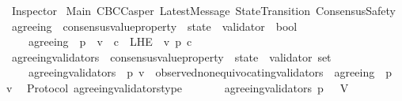 %
\begin{isabellebody}%
%
%
\isadelimtheory
%
\endisadelimtheory
%
\isatagtheory
{}\isamarkupfalse%
\ Inspector\isanewline
\isanewline
{}\ Main\ CBCCasper\ LatestMessage\ StateTransition\ ConsensusSafety\isanewline
\isanewline
{}%
\endisatagtheory
{\isafoldtheory}%
%
\isadelimtheory
\isanewline
%
\endisadelimtheory
\isanewline
\isanewline
\isanewline
\isanewline
\isanewline
\isanewline
\isanewline
\isanewline
\isanewline
\isanewline
\isanewline
\isanewline
\isanewline
\isanewline
\isanewline
\isanewline
\isanewline
\isanewline
{}\isamarkupfalse%
\ agreeing\ {\isacharcolon}{\isacharcolon}\ {\isachardoublequoteopen}{\isacharparenleft}consensus{\isacharunderscore}value{\isacharunderscore}property\ {\isacharasterisk}\ state\ {\isacharasterisk}\ validator{\isacharparenright}\ {\isasymRightarrow}\ bool{\isachardoublequoteclose}\isanewline
\ \ \isanewline
\ \ \ \ {\isachardoublequoteopen}agreeing\ {\isacharequal}\ {\isacharparenleft}{\isasymlambda}{\isacharparenleft}p{\isacharcomma}\ {\isasymsigma}{\isacharcomma}\ v{\isacharparenright}{\isachardot}\ {\isasymforall}\ c\ {\isasymin}\ L{\isacharunderscore}H{\isacharunderscore}E\ {\isasymsigma}\ v{\isachardot}\ p\ c{\isacharparenright}{\isachardoublequoteclose}\isanewline
\isanewline
\isanewline
{}\isamarkupfalse%
\ agreeing{\isacharunderscore}validators\ {\isacharcolon}{\isacharcolon}\ {\isachardoublequoteopen}{\isacharparenleft}consensus{\isacharunderscore}value{\isacharunderscore}property\ {\isacharasterisk}\ state{\isacharparenright}\ {\isasymRightarrow}\ validator\ set{\isachardoublequoteclose}\isanewline
\ \ \isanewline
\ \ \ \ {\isachardoublequoteopen}agreeing{\isacharunderscore}validators\ {\isacharequal}\ {\isacharparenleft}{\isasymlambda}{\isacharparenleft}p{\isacharcomma}\ {\isasymsigma}{\isacharparenright}{\isachardot}{\isacharbraceleft}v\ {\isasymin}\ observed{\isacharunderscore}non{\isacharunderscore}equivocating{\isacharunderscore}validators\ {\isasymsigma}{\isachardot}\ agreeing\ \ {\isacharparenleft}p{\isacharcomma}\ {\isasymsigma}{\isacharcomma}\ v{\isacharparenright}{\isacharbraceright}{\isacharparenright}{\isachardoublequoteclose}\isanewline
\isanewline
{}\isamarkupfalse%
\ {\isacharparenleft}\ Protocol{\isacharparenright}\ agreeing{\isacharunderscore}validators{\isacharunderscore}type\ {\isacharcolon}\isanewline
\ \ {\isachardoublequoteopen}{\isasymforall}\ {\isasymsigma}\ {\isasymin}\ {\isasymSigma}{\isachardot}\ agreeing{\isacharunderscore}validators\ {\isacharparenleft}p{\isacharcomma}\ {\isasymsigma}{\isacharparenright}\ {\isasymsubseteq}\ V{\isachardoublequoteclose}\isanewline

\end{isabellebody}
